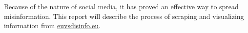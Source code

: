 \documentclass{article}
\begin{document}
Because of the nature of social media, it has proved an effective way to spread misinformation.
This report will describe the process of scraping and visualizing information from \href{http://euvsdisinfo.eu}{euvsdisinfo.eu}.
\\\\
\end{document}
